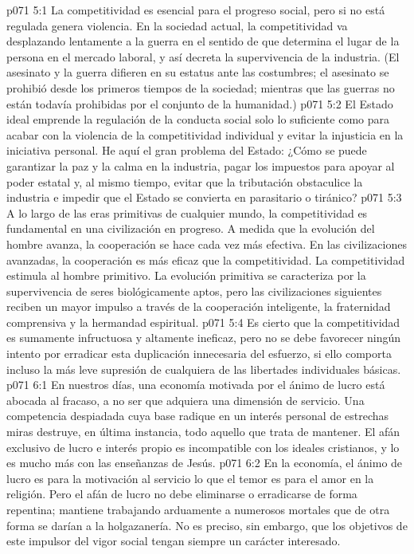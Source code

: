 \vs p071 5:1 La competitividad es esencial para el progreso social, pero si no está regulada genera violencia. En la sociedad actual, la competitividad va desplazando lentamente a la guerra en el sentido de que determina el lugar de la persona en el mercado laboral, y así decreta la supervivencia de la industria. (El asesinato y la guerra difieren en su estatus ante las costumbres; el asesinato se prohibió desde los primeros tiempos de la sociedad; mientras que las guerras no están todavía prohibidas por el conjunto de la humanidad.)
\vs p071 5:2 El Estado ideal emprende la regulación de la conducta social solo lo suficiente como para acabar con la violencia de la competitividad individual y evitar la injusticia en la iniciativa personal. He aquí el gran problema del Estado: ¿Cómo se puede garantizar la paz y la calma en la industria, pagar los impuestos para apoyar al poder estatal y, al mismo tiempo, evitar que la tributación obstaculice la industria e impedir que el Estado se convierta en parasitario o tiránico?
\vs p071 5:3 A lo largo de las eras primitivas de cualquier mundo, la competitividad es fundamental en una civilización en progreso. A medida que la evolución del hombre avanza, la cooperación se hace cada vez más efectiva. En las civilizaciones avanzadas, la cooperación es más eficaz que la competitividad. La competitividad estimula al hombre primitivo. La evolución primitiva se caracteriza por la supervivencia de seres biológicamente aptos, pero las civilizaciones siguientes reciben un mayor impulso a través de la cooperación inteligente, la fraternidad comprensiva y la hermandad espiritual.
\vs p071 5:4 Es cierto que la competitividad es sumamente infructuosa y altamente ineficaz, pero no se debe favorecer ningún intento por erradicar esta duplicación innecesaria del esfuerzo, si ello comporta incluso la más leve supresión de cualquiera de las libertades individuales básicas.
\vs p071 6:1 En nuestros días, una economía motivada por el ánimo de lucro está abocada al fracaso, a no ser que adquiera una dimensión de servicio. Una competencia despiadada cuya base radique en un interés personal de estrechas miras destruye, en última instancia, todo aquello que trata de mantener. El afán exclusivo de lucro e interés propio es incompatible con los ideales cristianos, y lo es mucho más con las enseñanzas de Jesús.
\vs p071 6:2 En la economía, el ánimo de lucro es para la motivación al servicio lo que el temor es para el amor en la religión. Pero el afán de lucro no debe eliminarse o erradicarse de forma repentina; mantiene trabajando arduamente a numerosos mortales que de otra forma se darían a la holgazanería. No es preciso, sin embargo, que los objetivos de este impulsor del vigor social tengan siempre un carácter interesado.
